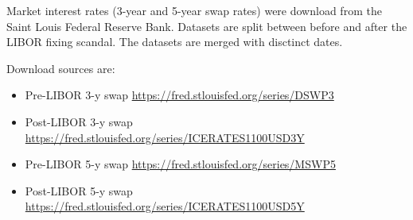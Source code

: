 \documentclass[11pt,]{report}
\begin{document}
Market interest rates (3-year and 5-year swap rates) were download from the Saint Louis Federal Reserve Bank. Datasets are split between before and after the LIBOR fixing scandal. The datasets are merged with disctinct dates.

Download sources are:

\begin{itemize}
\item
  Pre-LIBOR 3-y swap \url{https://fred.stlouisfed.org/series/DSWP3}
\item
  Post-LIBOR 3-y swap \url{https://fred.stlouisfed.org/series/ICERATES1100USD3Y}
\item
  Pre-LIBOR 5-y swap \url{https://fred.stlouisfed.org/series/MSWP5}
\item
  Post-LIBOR 5-y swap \url{https://fred.stlouisfed.org/series/ICERATES1100USD5Y}
\end{itemize}
\end{document}
